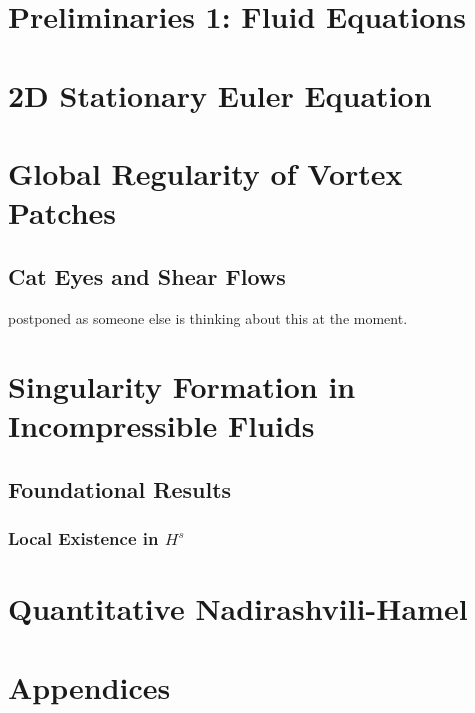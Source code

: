 


\rhead{\today} 

\chapter{Preliminaries 1: Fluid Equations}



\chapter{2D Stationary Euler Equation}

\chapter{Global Regularity of Vortex Patches}

\section{Cat Eyes and Shear Flows}

postponed as someone else is thinking about this at the moment.

\chapter{Singularity Formation in Incompressible Fluids}

\section{Foundational Results}

\subsection{Local Existence in $H^s$}

\chapter{Quantitative Nadirashvili-Hamel}



\chapter{Appendices}
